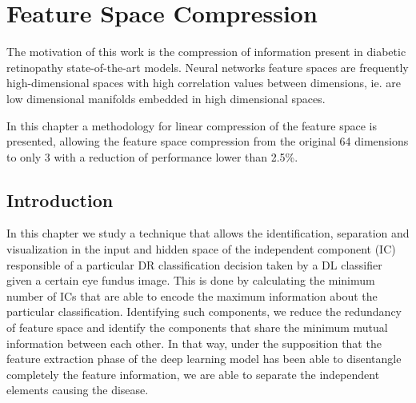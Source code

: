 
\chapter{Feature Space Compression} %

\label{Chapter:ICA} %

The motivation of this work is the compression of information present in diabetic retinopathy state-of-the-art models. Neural networks feature spaces are frequently high-dimensional spaces with high correlation values between dimensions, ie. are low dimensional manifolds embedded in high dimensional spaces. 

In this chapter a methodology for linear compression of the feature space is presented, allowing the feature space compression from the original 64 dimensions to only 3 with a reduction of performance lower than 2.5\%.


\section{Introduction}

In this chapter we study a technique that allows the identification, separation and visualization in the input and hidden space of the independent component (IC) responsible of a particular DR classification decision taken by a DL classifier given a certain eye fundus image. This is done by calculating the minimum number of ICs that are able to encode the maximum information about the particular classification. Identifying such components, we reduce the redundancy of feature space and identify the components that share the minimum mutual information between each other. In that way, under the supposition that the feature extraction phase of the deep learning model has been able to disentangle completely the feature information, we are able to separate the independent elements causing the disease.

